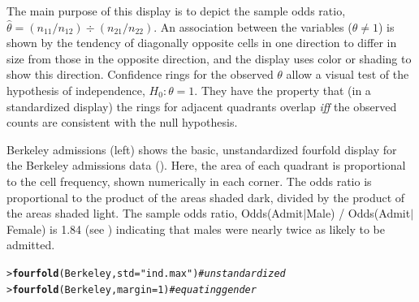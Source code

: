 \documentclass[10pt,krantz2]{krantz}\usepackage[]{graphicx}\usepackage[]{color}
\makeatletter
\newcommand{\hlnum}[1]{\textcolor[rgb]{0.686,0.059,0.569}{#1}}%
\newcommand{\hlstr}[1]{\textcolor[rgb]{0.192,0.494,0.8}{#1}}%
\newcommand{\hlcom}[1]{\textcolor[rgb]{0.678,0.584,0.686}{\textit{#1}}}%
\newcommand{\hlstd}[1]{\textcolor[rgb]{0.345,0.345,0.345}{#1}}%
\newcommand{\hlkwc}[1]{\textcolor[rgb]{0.333,0.667,0.333}{#1}}%
\newcommand{\hlkwd}[1]{\textcolor[rgb]{0.737,0.353,0.396}{\textbf{#1}}}%
\newenvironment{kframe}{%
 \def\at@end@of@kframe{}%
 \ifinner\ifhmode%
  \def\at@end@of@kframe{\end{minipage}}%
  \begin{minipage}{\columnwidth}%
 \fi\fi%
 \def\FrameCommand##1{\hskip\@totalleftmargin \hskip-\fboxsep
 \colorbox{shadecolor}{##1}\hskip-\fboxsep
     \hskip-\linewidth \hskip-\@totalleftmargin \hskip\columnwidth}%
 \MakeFramed {\advance\hsize-\width
   \@totalleftmargin\z@ \linewidth\hsize
   \@setminipage}}%
 {\par\unskip\endMakeFramed%
 \at@end@of@kframe}
\newenvironment{knitrout}{}{} %
\renewenvironment{knitrout}{\small\renewcommand{\baselinestretch}{.85}}{} %
\makeatother
\begin{document}
The main purpose of this display is to depict the sample odds ratio,
\(\hat{\theta} = (n_{11} /  n_{12} )
\div  (n_{21} /  n_{22} )\).
An association between the variables
(\(\theta \neq 1\)) is shown by the tendency of diagonally opposite
cells in one direction to differ in size from those in the opposite
direction, and the display uses color or shading to show this
direction.  Confidence rings for the observed \(\theta\) allow a
visual test of the hypothesis of independence,
 \(H_0 :  \theta  =  1\).  They have
the property that (in a standardized display) the rings for adjacent quadrants overlap \emph{iff}
the observed counts are consistent with the null hypothesis.

\begin{Example}[berkeley2]{Berkeley admissions}
 (left) shows the basic, unstandardized
fourfold display for the
Berkeley admissions data ().
Here, the area of each quadrant is proportional to the cell frequency,
shown numerically in each corner.
The odds ratio is proportional to the product of the areas
shaded dark, divided by the product of the areas shaded light.
The sample odds ratio, Odds(Admit\(|\)Male) / Odds(Admit\(|\)Female) is
1.84 (see )
indicating that males were nearly twice as likely to be admitted.

\begin{knitrout}
\color{fgcolor}\begin{kframe}
\begin{alltt}
\hlstd{> }\hlkwd{fourfold}\hlstd{(Berkeley,} \hlkwc{std} \hlstd{=} \hlstr{"ind.max"}\hlstd{)}   \hlcom{# unstandardized}
\hlstd{> }\hlkwd{fourfold}\hlstd{(Berkeley,} \hlkwc{margin} \hlstd{=} \hlnum{1}\hlstd{)}        \hlcom{# equating gender}
\end{alltt}
\end{kframe}\begin{figure}[!htbp]


\end{figure}
\end{knitrout}
\end{Example}
\end{document}
